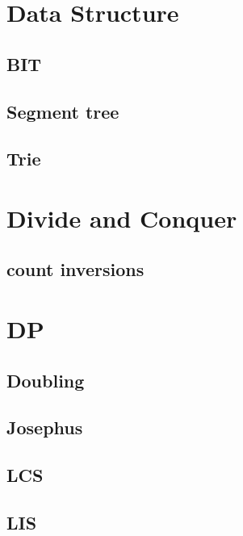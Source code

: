\section{Data Structure}
        \subsection{BIT}
                
        \subsection{Segment tree}
                
        \subsection{Trie}
                

\section{Divide and Conquer}
        \subsection{count inversions}
                

\section{DP} 
        \subsection{Doubling}
                
        \subsection{Josephus}
                
        \subsection{LCS}
                
        \subsection{LIS}
                  

